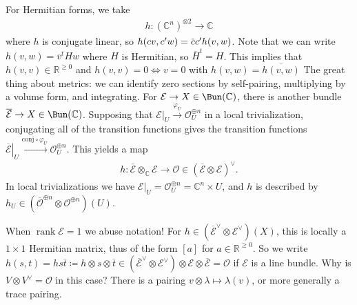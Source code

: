 \begin{remark}

For Hermitian forms, we take
\begin{align*}
h: ({\mathbb{C}}^n)^{\otimes 2}\to {\mathbb{C}}
\end{align*}
where \(h\) is conjugate linear, so
\(h(cv, c'w) = \mkern 1.5mu\overline{\mkern-1.5muc\mkern-1.5mu}\mkern 1.5muc' h(v, w)\).
Note that we can write \(h(v, w) = {\overline{{v}}}^t H w\) where \(H\)
is Hermitian, so \({\overline{{H}}}^t = H\). This implies that
\(h(v,v) \in {\mathbb{R}}^{\geq 0}\) and \(h(v,v) = 0 \iff v=0\) with
\(h(v, w) = {\overline{{h(v, w)}}}\) The great thing about metrics: we
can identify zero sections by self-pairing, multiplying by a volume
form, and integrating. For \(\mathcal{E}\to X \in \Bun({\mathbb{C}})\),
there is another bundle
\({\overline{{\mathcal{E}}}} \to X \in \Bun({\mathbb{C}})\). Supposing
that
\({ \left.{{ \mathcal{E}}} \right|_{{U}} } \xrightarrow{\varphi_U} {\mathcal{O}}_U^{\oplus n}\)
in a local trivialization, conjugating all of the transition functions
gives the transition functions
\({ \left.{{ {\overline{{ \mathcal{E}}}} }} \right|_{{U}} } \xrightarrow{\mathrm{conj} \circ \varphi_U} {\mathcal{O}}_U^{\oplus n}\).
This yields a map
\begin{align*}
h: {\overline{{ \mathcal{E} }}} \otimes_{\mathbb{C}}\mathcal{E} \to {\mathcal{O}}\in ( {\overline{{\mathcal{E}}}} \otimes\mathcal{E} )^\vee
.\end{align*}
In local trivializations we have
\({ \left.{{ \mathcal{E} }} \right|_{{U}} } = {\mathcal{O}}_U^{\oplus n} = {\mathbb{C}}^n \times U\),
and \(h\) is described by
\(h_U \in ({\overline{{ {\mathcal{O}}}}}^{\oplus n} \otimes{\mathcal{O}}^{\oplus n})(U)\).

\end{remark}

\begin{remark}

When \(\operatorname{rank}\mathcal{E} = 1\) we abuse notation! For
\(h\in ({\overline{{\mathcal{E}}}}^\vee\otimes\mathcal{E}^\vee)(X)\),
this is locally a \(1\times 1\) Hermitian matrix, thus of the form
\([a]\) for \(a\in {\mathbb{R}}^{\geq 0}\). So we write
\(h(s, t) = hs{\overline{{t}}} \coloneqq h\otimes s \otimes{\overline{{t}}} \in ({\overline{{\mathcal{E}}}}^\vee\otimes\mathcal{E}^\vee) \otimes\mathcal{E} \otimes{\overline{{\mathcal{E}}}} = {\mathcal{O}}\)
if \(\mathcal{E}\) is a line bundle. Why is
\(V\otimes V^\vee= {\mathcal{O}}\) in this case? There is a pairing
\(v\otimes\lambda \mapsto \lambda(v)\), or more generally a trace
pairing.

\end{remark}

